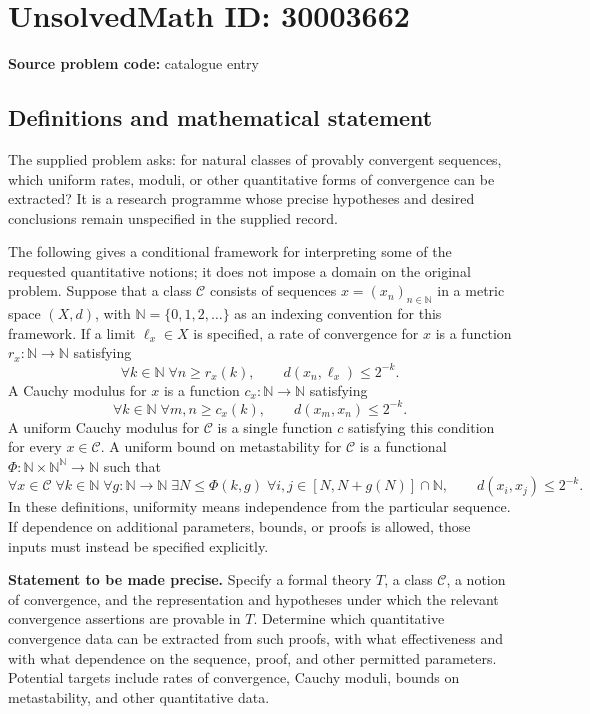 \documentclass[11pt]{article}
\newcommand{\N}{\mathbb{N}}
\begin{document}
\section*{UnsolvedMath ID: 30003662}
\textbf{Source problem code:} catalogue entry
\subsection{Definitions and mathematical statement}
The supplied problem asks: for natural classes of provably convergent sequences, which uniform rates, moduli, or other quantitative forms of convergence can be extracted? It is a research programme whose precise hypotheses and desired conclusions remain unspecified in the supplied record.

The following gives a conditional framework for interpreting some of the requested quantitative notions; it does not impose a domain on the original problem. Suppose that a class \(\mathcal C\) consists of sequences \(x=(x_n)_{n\in\N}\) in a metric space \((X,d)\), with \(\N=\{0,1,2,\ldots\}\) as an indexing convention for this framework. If a limit \(\ell_x\in X\) is specified, a rate of convergence for \(x\) is a function \(r_x:\N\to\N\) satisfying
\[
\forall k\in\N\;\forall n\ge r_x(k),\qquad d(x_n,\ell_x)\le 2^{-k}.
\]
A Cauchy modulus for \(x\) is a function \(c_x:\N\to\N\) satisfying
\[
\forall k\in\N\;\forall m,n\ge c_x(k),\qquad d(x_m,x_n)\le 2^{-k}.
\]
A uniform Cauchy modulus for \(\mathcal C\) is a single function \(c\) satisfying this condition for every \(x\in\mathcal C\). A uniform bound on metastability for \(\mathcal C\) is a functional \(\Phi:\N\times\N^{\N}\to\N\) such that
\[
\forall x\in\mathcal C\;\forall k\in\N\;\forall g:\N\to\N\;
\exists N\le\Phi(k,g)\;
\forall i,j\in[N,N+g(N)]\cap\N,\qquad
 d(x_i,x_j)\le 2^{-k}.
\]
In these definitions, uniformity means independence from the particular sequence. If dependence on additional parameters, bounds, or proofs is allowed, those inputs must instead be specified explicitly.

\textbf{Statement to be made precise.} Specify a formal theory \(T\), a class \(\mathcal C\), a notion of convergence, and the representation and hypotheses under which the relevant convergence assertions are provable in \(T\). Determine which quantitative convergence data can be extracted from such proofs, with what effectiveness and with what dependence on the sequence, proof, and other permitted parameters. Potential targets include rates of convergence, Cauchy moduli, bounds on metastability, and other quantitative data.
\end{document}

